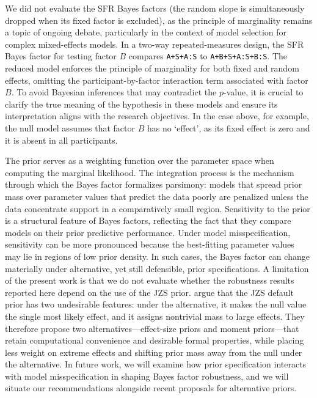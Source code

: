 \documentclass[preprint,12pt,authoryear]{elsarticle}
\begin{document}
We did not evaluate the SFR Bayes factors (the random slope is simultaneously dropped when its fixed factor is excluded), as the principle of marginality remains a topic of ongoing debate, particularly in the context of model selection for complex mixed-effects models. In a two-way repeated-measures design, the SFR Bayes factor for testing factor $B$ compares \texttt{A+S+A:S} to \texttt{A+B+S+A:S+B:S}. The reduced model enforces the principle of marginality for both fixed and random effects, omitting the participant-by-factor interaction term associated with factor $B$. To avoid Bayesian inferences that may contradict the $p$-value, it is crucial to clarify the true meaning of the hypothesis in these models and ensure its interpretation aligns with the research objectives. In the case above, for example, the null model assumes that factor $B$ has no `effect', as its fixed effect is zero and it is absent in all participants.

The prior serves as a weighting function over the parameter space when computing the marginal likelihood. The integration process is the mechanism through which the Bayes factor formalizes parsimony: models that spread prior mass over parameter values that predict the data poorly are penalized unless the data concentrate support in a comparatively small region. Sensitivity to the prior is a structural feature of Bayes factors, reflecting the fact that they compare models on their prior predictive performance. Under model misspecification, sensitivity can be more pronounced because the best-fitting parameter values may lie in regions of low prior density. In such cases, the Bayes factor can change materially under alternative, yet still defensible, prior specifications. A limitation of the present work is that we do not evaluate whether the robustness results reported here depend on the use of the JZS prior. \citet{klauer_bayes_2025} argue that the JZS default prior has two undesirable features: under the alternative, it makes the null value the single most likely effect, and it assigns nontrivial mass to large effects. They therefore propose two alternatives—effect-size priors and moment priors—that retain computational convenience and desirable formal properties, while placing less weight on extreme effects and shifting prior mass away from the null under the alternative. In future work, we will examine how prior specification interacts with model misspecification in shaping Bayes factor robustness, and we will situate our recommendations alongside recent proposals for alternative priors.
\end{document}
